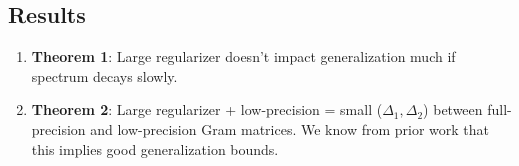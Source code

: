 \subsection{Results}
\begin{enumerate}
	\item \textbf{Theorem 1}: Large regularizer doesn't impact generalization much if spectrum decays slowly.
	\item \textbf{Theorem 2}: Large regularizer + low-precision = small ($\Delta_1,\Delta_2$) between full-precision and low-precision Gram matrices.  We know from prior work that this implies good generalization bounds.
\end{enumerate}

